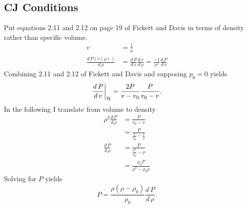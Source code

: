 \documentclass[]{article}
\begin{document}
\subsection{CJ Conditions}
\label{sec:CJ}

Put equations 2.11 and 2.12 on page 19 of Fickett and Davis in terms
of density rather than specific volume.
\begin{align*}
  v &= \frac{1}{\rho} \\
  \frac{d\, P(v(\rho))}{d\,\rho} &= \frac{d\, P}{d\, v} \frac{d\,
    v}{d\, \rho} = \frac{-1}{\rho^2} \frac{d\, P}{d\, v}
\end{align*}
Combining 2.11 and 2.12 of Fickett and Davis and supposing $p_0 = 0$
yields
\begin{equation*}
  \left. \frac{d\, P}{d\, v} \right|_{\cal H} = \frac{2P}{v-v_0}
  \frac{P}{v_0-v}.
\end{equation*}
In the following I translate from volume to density
\begin{align*}
  \rho^2 \frac{d\, P}{d\, \rho} &= \frac{P}{v_0-v} \\
  &= \frac{P}{\frac{1}{\rho_0}-\frac{1}{\rho}} \\
  \frac{d\, P}{d\, \rho} &= \frac{P}{\frac{\rho^2}{\rho_0}-\rho} \\
  &= \frac{\rho_0 P}{\rho^2 - \rho_0\rho}
\end{align*}
Solving for $P$ yields
\begin{equation*}
  P = \frac{\rho(\rho - \rho_0) }{\rho_0}\frac{d\, P}{d\, \rho}.
\end{equation*}
\end{document}
